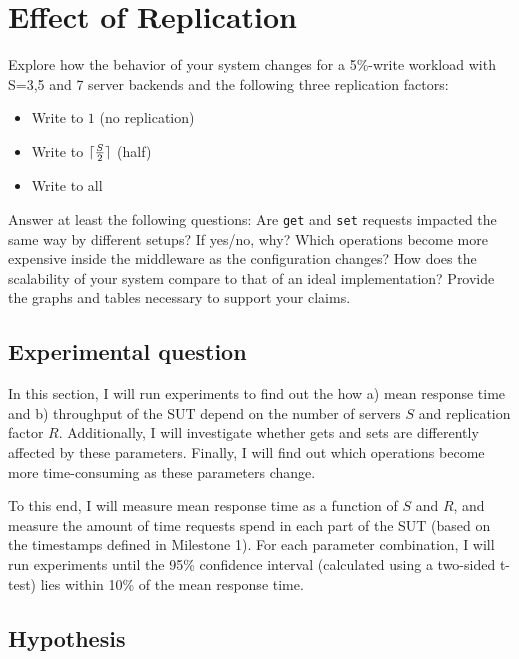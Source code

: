 \documentclass[11pt]{article}
\DeclarePairedDelimiter{\ceil}{\lceil}{\rceil}
\begin{document}
\section{Effect of Replication}

Explore how the behavior of your system changes for a 5\%-write workload with S=3,5 and 7 server backends and the following three replication factors:
\begin{itemize} 
\item Write to $1$ (no replication) 
\item Write to $\ceil{\frac{S}{2}}$ (half) 
\item Write to all 
\end{itemize}

Answer at least the following questions: Are \texttt{get} and \texttt{set} requests impacted the same way by different setups? If yes/no, why? Which operations become more expensive inside the middleware as the configuration changes? How does the scalability of your system compare to that of an ideal implementation? Provide the graphs and tables necessary to support your claims.


\subsection{Experimental question}

In this section, I will run experiments to find out the how a) mean response time and b) throughput of the SUT depend on the number of servers $S$ and replication factor $R$. Additionally, I will investigate whether gets and sets are differently affected by these parameters. Finally, I will find out which operations become more time-consuming as these parameters change.

To this end, I will measure mean response time as a function of $S$ and $R$, and measure the amount of time requests spend in each part of the SUT (based on the timestamps defined in Milestone 1). For each parameter combination, I will run experiments until the 95\% confidence interval (calculated using a two-sided t-test) lies within 10\% of the mean response time.


\subsection{Hypothesis}
\end{document}
